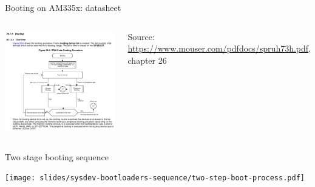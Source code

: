 \begin{frame}{Booting on AM335x: datasheet}
  \begin{columns}
      \begin{center}
        \includegraphics[height=0.85\textheight]{slides/sysdev-bootloaders-sequence/am335x-rom-code.png}
      \end{center}
      {\tiny
        Source:\\
        \url{https://www.mouser.com/pdfdocs/spruh73h.pdf},\\
	chapter 26
      }
    \end{columns}
\end{frame}

\begin{frame}{Two stage booting sequence}
  \begin{center}
    \texttt{[image: slides/sysdev-bootloaders-sequence/two-step-boot-process.pdf]}
  \end{center}
\end{frame}

